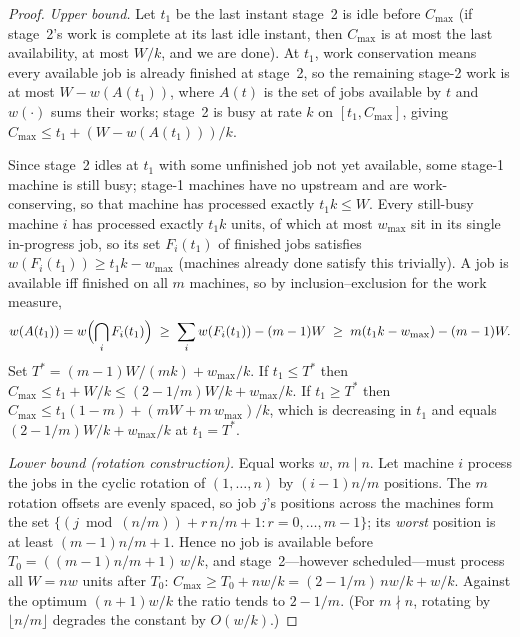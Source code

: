 \documentclass[sn-mathphys,NameDate]{sn-jnl}
\theoremstyle{thmstyleone}
\theoremstyle{thmstylethree}
\theoremstyle{thmstyletwo}
\begin{document}
\begin{proof}
\emph{Upper bound.} Let $t_1$ be the last instant stage~2 is idle
before $C_{\max}$ (if stage~2's work is complete at its last idle
instant, then $C_{\max}$ is at most the last availability, at most
$W/k$, and we are done). At $t_1$, work conservation means every
available job is already finished at stage~2, so the remaining
stage-2 work is at most $W - w(A(t_1))$, where $A(t)$ is the set of
jobs available by $t$ and $w(\cdot)$ sums their works; stage~2 is
busy at rate $k$ on $[t_1, C_{\max}]$, giving
$C_{\max} \le t_1 + (W - w(A(t_1)))/k$.

Since stage~2 idles at $t_1$ with some unfinished job not yet
available, some stage-1 machine is still busy; stage-1 machines
have no upstream and are work-conserving, so that machine has
processed exactly $t_1 k \le W$. Every still-busy machine $i$ has
processed exactly $t_1 k$ units, of which at most $w_{\max}$ sit in
its single in-progress job, so its set $F_i(t_1)$ of finished jobs
satisfies $w(F_i(t_1)) \ge t_1 k - w_{\max}$ (machines already done
satisfy this trivially). A job is available iff finished on all $m$
machines, so by inclusion--exclusion for the work measure,
\[
w(A(t_1)) = w\Bigl(\bigcap_i F_i(t_1)\Bigr)
\;\ge\; \sum_i w(F_i(t_1)) - (m-1)W
\;\ge\; m(t_1 k - w_{\max}) - (m-1)W .
\]
Set $T^* = (m-1)W/(mk) + w_{\max}/k$. If $t_1 \le T^*$ then
$C_{\max} \le t_1 + W/k \le (2-1/m)W/k + w_{\max}/k$. If
$t_1 \ge T^*$ then
$C_{\max} \le t_1(1-m) + (mW + m\,w_{\max})/k$, which is decreasing
in $t_1$ and equals $(2-1/m)W/k + w_{\max}/k$ at $t_1 = T^*$.

\emph{Lower bound (rotation construction).} Equal works $w$,
$m \mid n$. Let machine $i$ process the jobs in the cyclic rotation
of $(1,\dots,n)$ by $(i-1)n/m$ positions. The $m$ rotation offsets
are evenly spaced, so job $j$'s positions across the machines form
the set $\{(j \bmod (n/m)) + r\,n/m + 1 : r = 0,\dots,m-1\}$; its
\emph{worst} position is at least $(m-1)n/m + 1$. Hence no job is
available before $T_0 = ((m-1)n/m + 1)\,w/k$, and stage~2---however
scheduled---must process all $W = nw$ units after $T_0$:
$C_{\max} \ge T_0 + nw/k = (2 - 1/m)\,nw/k + w/k$. Against the
optimum $(n+1)w/k$ the ratio tends to $2 - 1/m$. (For $m \nmid n$,
rotating by $\lfloor n/m \rfloor$ degrades the constant by
$O(w/k)$.)
\end{proof}
\end{document}
